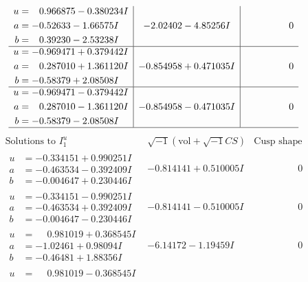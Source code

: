 \documentclass[1p]{elsarticle_modified}
\theoremstyle{definition}
\newcommand{\I}{\sqrt{-1}}
\begin{document}
$$\begin{array}{c|c|c}
\begin{aligned}
u &= \phantom{-}0.966875 - 0.380234 I \\
a &= -0.52633 - 1.66575 I \\
b &= \phantom{-}0.39230 - 2.53238 I\end{aligned}
 & -2.02402 - 4.85256 I & \phantom{-0.000000 } 0 \\ \hline\begin{aligned}
u &= -0.969471 + 0.379442 I \\
a &= \phantom{-}0.287010 + 1.361120 I \\
b &= -0.58379 + 2.08508 I\end{aligned}
 & -0.854958 + 0.471035 I & \phantom{-0.000000 } 0 \\ \hline\begin{aligned}
u &= -0.969471 - 0.379442 I \\
a &= \phantom{-}0.287010 - 1.361120 I \\
b &= -0.58379 - 2.08508 I\end{aligned}
 & -0.854958 - 0.471035 I & \phantom{-0.000000 } 0\\
 \hline 
 \end{array}$$\newpage$$\begin{array}{c|c|c}  
\text{Solutions to }I^u_{1}& \I (\text{vol} + \sqrt{-1}CS) & \text{Cusp shape}\\
 \hline 
\begin{aligned}
u &= -0.334151 + 0.990251 I \\
a &= -0.463534 - 0.392409 I \\
b &= -0.004647 + 0.230446 I\end{aligned}
 & -0.814141 + 0.510005 I & \phantom{-0.000000 } 0 \\ \hline\begin{aligned}
u &= -0.334151 - 0.990251 I \\
a &= -0.463534 + 0.392409 I \\
b &= -0.004647 - 0.230446 I\end{aligned}
 & -0.814141 - 0.510005 I & \phantom{-0.000000 } 0 \\ \hline\begin{aligned}
u &= \phantom{-}0.981019 + 0.368545 I \\
a &= -1.02461 + 0.98094 I \\
b &= -0.46481 + 1.88356 I\end{aligned}
 & -6.14172 - 1.19459 I & \phantom{-0.000000 } 0 \\ \hline\begin{aligned}
u &= \phantom{-}0.981019 - 0.368545 I \\

\end{aligned}
\end{array}$$
\end{document}

